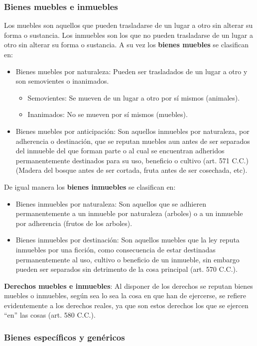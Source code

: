 \documentclass{templateNote}
\begin{document}
\subsubsection*{Bienes muebles e inmuebles}
Los muebles son aquellos que pueden trasladarse de un lugar a otro sin alterar su forma o sustancia. Los inmuebles son los que no pueden trasladarse de un lugar a otro sin alterar su forma o sustancia.
A su vez los \textbf{bienes muebles} se clasifican en:
\begin{itemize}
    \item Bienes muebles por naturaleza: Pueden ser trasladados de un lugar a otro y son semovientes o inanimados.
    \begin{itemize}
        \item Semovientes: Se mueven de un lugar a otro por sí mismos (animales).
        \item Inanimados: No se mueven por sí mismos (muebles).
    \end{itemize} 
    \item Bienes muebles por anticipación: Son aquellos inmuebles por naturaleza, por adherencia o destinación, que se reputan muebles aun antes de ser separados del inmueble del que forman parte o al cual se encuentran adheridos permanentemente destinados para su uso, beneficio o cultivo (art. 571 C.C.) (Madera del bosque antes de ser cortada, fruta antes de ser cosechada, etc).
\end{itemize}
De igual manera los \textbf{bienes inmuebles} se clasifican en:
\begin{itemize}
    \item Bienes inmuebles por naturaleza: Son aquellos que se adhieren permanentemente a un inmueble por naturaleza (arboles) o a un inmueble por adherencia (frutos de los arboles).
    \item Bienes inmuebles por destinación: Son aquellos muebles que la ley reputa inmuebles por una ficción, como consecuencia de estar destinadas permanentemente al uso, cultivo o beneficio de un inmueble, sin embargo pueden ser separados sin detrimento de la cosa principal (art. 570 C.C.).
\end{itemize}

\textbf{Derechos muebles e inmuebles}: Al disponer de los derechos se reputan bienes muebles o inmuebles, según sea lo sea la cosa en que han de ejercerse, se refiere evidentemente a los derechos reales, ya que son estos derechos los que se ejercen ``en'' las cosas (art. 580 C.C.).


\subsubsection*{Bienes específicos y genéricos}
\end{document}
